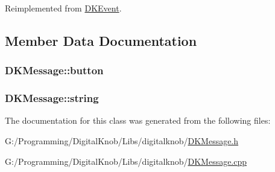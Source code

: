 Reimplemented from \hyperlink{class_d_k_event_a6161540936445623e8a208c01686bcc6}{D\-K\-Event}.



\subsection{Member Data Documentation}
\hypertarget{class_d_k_message_a8191a96699ef2813242b909273da7786}{
\subsubsection[{button}]{ D\-K\-Message\-::button}}\label{class_d_k_message_a8191a96699ef2813242b909273da7786}
\hypertarget{class_d_k_message_a16744276ca1bfffa00b31703d564c91a}{
\subsubsection[{string}]{ D\-K\-Message\-::string}}\label{class_d_k_message_a16744276ca1bfffa00b31703d564c91a}


The documentation for this class was generated from the following files\-:\begin{DoxyCompactItemize}
\item 
G\-:/\-Programming/\-Digital\-Knob/\-Libs/digitalknob/\hyperlink{_d_k_message_8h}{D\-K\-Message.\-h}\item 
G\-:/\-Programming/\-Digital\-Knob/\-Libs/digitalknob/\hyperlink{_d_k_message_8cpp}{D\-K\-Message.\-cpp}\end{DoxyCompactItemize}
